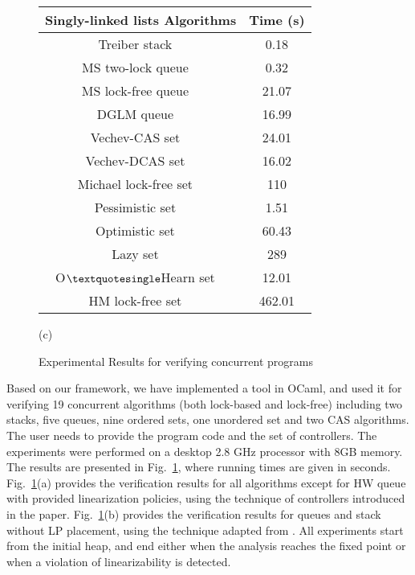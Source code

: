 \begin{figure}[]
\begin{tabular}{|c | c | }
  \hline
   \textsf{\textbf{{Singly-linked lists Algorithms}}} &  \textsf{\textbf{{Time (s)}}} \\
\hline
\textsf{Treiber stack  ~\cite{Treiber:stack}}\;\;\;\;\;\; & \textsf {0.18} \\
\hline
\textsf{MS two-lock queue  ~\cite{MS:QueueAlgorithms}}\;\;\;\;\;\;  & \textsf{0.32} \\
\hline
\textsf{MS lock-free queue  ~\cite{MS:QueueAlgorithms}}& \textsf{21.07} \\
\hline
\textsf{DGLM queue  ~\cite{Doherty:lockfree}}&  \textsf {16.99} \\
\hline
\textsf{Vechev-CAS set  ~\cite{Vechev:list}}  & \textsf{24.01} \\
\hline
\textsf{Vechev-DCAS set  ~\cite{Vechev:list}}   & \textsf{16.02}  \\
\hline
\textsf{Michael lock-free set ~\cite{Michael:list}}  & \textsf{110}  \\
\hline
\textsf{Pessimistic set  ~\cite{ArtOfMpP}}&\textsf{1.51} \\
\hline
\textsf{Optimistic set ~\cite{ArtOfMpP}}& \textsf{60.43} \\
\hline
\textsf{Lazy set ~\cite{Lazyset}  }  & \textsf {289} \\
\hline
\textsf {O$\textquotesingle $Hearn set  ~\cite{OHearnlist}}     & \textsf{12.01} \\
\hline
\textsf{HM lock-free set  ~\cite{ArtOfMpP} } & \textsf{462.01} \\
\hline
\end{tabular}


\vspace*{0.1cm}

(c)
\\
\caption{Experimental Results for verifying concurrent programs}
\label{Experiments:fig}
\end{figure}
Based on our framework, we have implemented a tool in OCaml, and used
it for
verifying 19 concurrent algorithms (both lock-based and lock-free)
including two stacks, 
five queues, nine ordered sets, one unordered set and two CAS algorithms. 
%
The user needs to provide the program code and the 
set of controllers.
%
The experiments were performed on a desktop 2.8 GHz processor with 8GB memory.
The results are presented in Fig.~\ref{Experiments:fig},
where running times are given in seconds. 
Fig.~\ref{Experiments:fig}(a) provides the verification
results for all algorithms except for HW queue with provided 
linearization policies, using the technique of controllers introduced in 
the paper. Fig.~\ref{Experiments:fig}(b) provides the verification
results for queues and stack without LP placement, using the technique 
adapted from \cite{BEEH:icalp15,HSV:concur13}.
%
All experiments start from the initial heap,  
and end either when the analysis 
reaches the fixed point or when a violation of linearizability is detected. 

